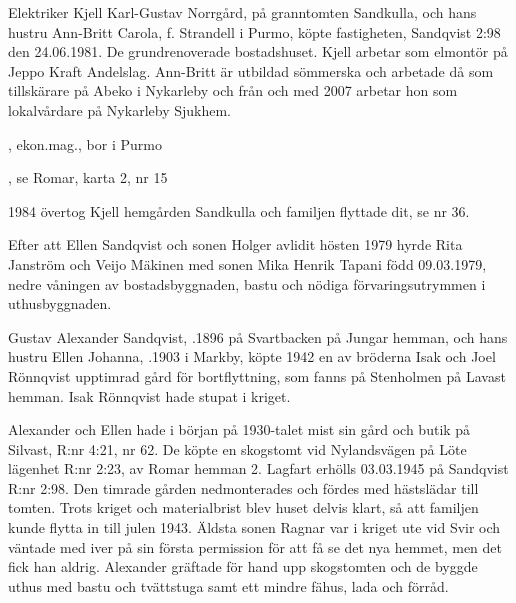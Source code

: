 Elektriker Kjell Karl-Gustav Norrgård,  på granntomten Sandkulla, och hans hustru Ann-Britt Carola, f. Strandell  i Purmo, köpte fastigheten, Sandqvist 2:98 den 24.06.1981. De grundrenoverade bostadshuset. Kjell arbetar som elmontör på Jeppo Kraft Andelslag. Ann-Britt är utbildad sömmerska och arbetade då som tillskärare på Abeko i Nykarleby och från och med 2007 arbetar hon som lokalvårdare på Nykarleby Sjukhem.
\begin{jhchildren}
  \item {}, ekon.mag., bor i Purmo
  \item {}, se Romar, karta 2, nr 15
\end{jhchildren}

1984 övertog Kjell hemgården Sandkulla och familjen flyttade dit, se nr 36.


Efter att Ellen Sandqvist och sonen Holger avlidit hösten 1979 hyrde Rita Janström och Veijo Mäkinen med sonen Mika Henrik Tapani född 09.03.1979, nedre våningen av bostadsbyggnaden, bastu och nödiga förvaringsutrymmen i uthusbyggnaden.


Gustav Alexander Sandqvist, .1896 på Svartbacken på Jungar hemman, och hans hustru Ellen Johanna, .1903 i Markby, köpte 1942 en av bröderna Isak och Joel Rönnqvist upptimrad gård för bortflyttning, som fanns på Stenholmen på Lavast hemman. Isak Rönnqvist hade stupat i kriget.

Alexander och Ellen hade i början på 1930-talet mist sin gård och butik på Silvast, R:nr 4:21, nr 62.  De köpte en skogstomt vid Nylandsvägen på Löte lägenhet R:nr 2:23, av Romar hemman 2. Lagfart erhölls 03.03.1945 på Sandqvist R:nr 2:98. Den timrade gården nedmonterades och fördes med hästslädar till tomten. Trots kriget och materialbrist blev huset delvis klart, så att familjen kunde flytta in till julen 1943. Äldsta sonen Ragnar var i kriget ute vid Svir och väntade med iver på sin första permission för att få se det nya hemmet, men det fick han aldrig. Alexander gräftade för hand upp skogstomten och de byggde uthus med bastu och tvättstuga samt ett mindre fähus, lada och förråd.


